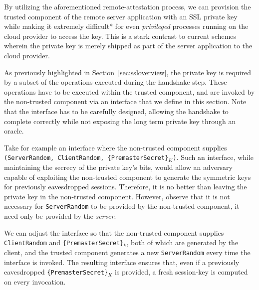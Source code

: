 \documentclass[../main.tex]{subfiles}
\begin{document}
By utilizing the aforementioned remote-attestation process, we can
provision the trusted component of the remote server application with
an SSL private key while making it extremely difficult* for even
\textit{privileged} processes running on the cloud provider to access
the key. This is a stark contrast to current schemes wherein the
private key is merely shipped as part of the server application to the
cloud provider.

As previously highlighted in Section~\ref{sec:ssloverview}, the
private key is required by a subset of the operations executed during
the handshake step. These operations have to be executed within the
trusted component, and are invoked by the non-trusted component via an
interface that we define in this section. Note that the interface has
to be carefully designed, allowing the handshake to complete correctly
while not exposing the long term private key through an oracle.



Take for example an interface where the non-trusted component supplies
\texttt{(ServerRandom, ClientRandom, \{PremasterSecret\}$_K$)}. Such
an interface, while maintaining the secrecy of the private key's bits,
would allow an adversary capable of exploiting the non-trusted
component to generate the symmetric keys for previously eavesdropped
sessions. Therefore, it is no better than leaving the private key in
the non-trusted component.  However, observe that it is not necessary
for \texttt{ServerRandom} to be provided by the non-trusted component,
it need only be provided by the \textit{server}.


We can adjust the interface so that the non-trusted component supplies
\texttt{ClientRandom} and \texttt{\{PremasterSecret\}$_k$}, both of
which are generated by the client, and the trusted component generates
a new \texttt{ServerRandom} every time the interface is invoked. The
resulting interface ensures that, even if a previously eavesdropped
\texttt{\{PremasterSecret\}$_K$} is provided, a fresh session-key is
computed on every invocation.

\end{document}
